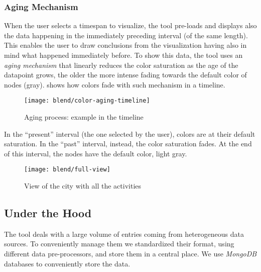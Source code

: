 \subsubsection{Aging Mechanism}

When the user selects a timespan to visualize, the tool pre-loads and displays also the data happening in the immediately preceding interval (of the same length).
This enables the user to draw conclusions from the visualization having also in mind what happened immediately before.
To show this data, the tool uses an \emph{aging mechanism} that linearly reduces the color saturation as the age of the datapoint grows, \ie the older the more intense fading towards the default color of nodes (\ie gray).
 shows how colors fade with such mechanism in a timeline.

\begin{figure}[!ht]
\centering
\texttt{[image: blend/color-aging-timeline]}
\caption{Aging process: example in the timeline}
\label{fig:color-aging-timeline}
\end{figure}


In the ``present'' interval (\ie the one selected by the user), colors are at their default saturation.
In the ``past''  interval, instead, the color saturation fades.
At the end of this interval, the nodes have the default color, \ie light gray.



\begin{figure*}[ht]
\centering
\texttt{[image: blend/full-view]}
\caption{View of the city with all the activities}
\label{fig:full-view}
\end{figure*}



\subsection{Under the Hood}

The tool deals with a large volume of entries coming from heterogeneous data sources.
To conveniently manage them we standardized their format, using different data pre-processors, and store them in a central place.
We use \textit{MongoDB} databases to conveniently store the data.

